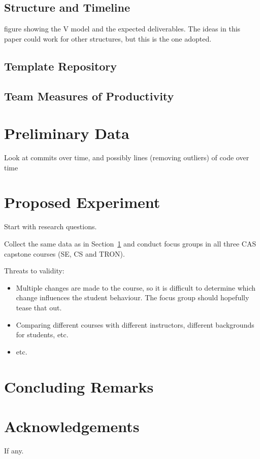 \documentclass[10pt, conference]{IEEEtran}
\begin{document}
\subsection{Structure and Timeline}

figure showing the V model and the expected deliverables.  The ideas in this
paper could work for other structures, but this is the one adopted.

\subsection{Template Repository}

\subsection{Team Measures of Productivity}

\section{Preliminary Data} \label{SecPrelimData}

Look at commits over time, and possibly lines (removing outliers) of code over
time

\section{Proposed Experiment} \label{SecProposedExperiment}

Start with research questions.

Collect the same data as in Section~\ref{SecPrelimData} and conduct focus groups
in all three CAS capstone courses (SE, CS and TRON).  

Threats to validity:

\begin{itemize}
    \item Multiple changes are made to the course, so it is difficult to
    determine which change influences the student behaviour.  The focus group
    should hopefully tease that out.
    \item Comparing different courses with different instructors, different
    backgrounds for students, etc.
    \item etc.
\end{itemize}

\section{Concluding Remarks} \label{SecConclusions}

\section*{Acknowledgements}

If any.



\end{document}
